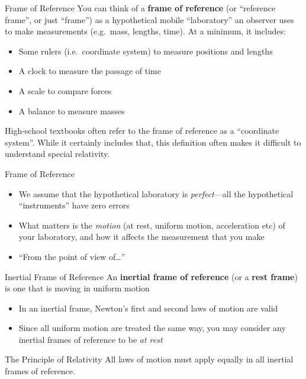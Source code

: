 \documentclass[12pt,compress,aspectratio=169]{beamer}
\begin{document}
\begin{frame}{Frame of Reference}
  You can think of a \textbf{frame of reference} (or ``reference frame'', or
  just ``frame'') as a hypothetical mobile ``laboratory'' an observer uses to
  make measurements (e.g.\ mass, lengths, time). At a minimum, it includes:
  \begin{itemize}
  \item Some rulers (i.e.\ coordinate system) to measure  positions and lengths
  \item A clock to measure the passage of time
  \item A scale to compare forces
  \item A balance to measure masses
  \end{itemize}
  \vspace{.15in}\textcolor{red!85}{High-school textbooks often refer to the
    frame of reference as a ``coordinate system''. While it certainly includes
    that, this definition often makes it difficult to understand special
    relativity.}
\end{frame}



\begin{frame}{Frame of Reference}
  \begin{itemize}
  \item We assume that the hypothetical laboratory is \emph{perfect}---all the
    hypothetical ``instruments'' have zero errors
  \item What matters is the \emph{motion} (at rest, uniform motion, acceleration
    etc) of your laboratory, and how it affects the measurement that you make
  \item ``From the point of view of\ldots''
  \end{itemize}
\end{frame}


\begin{frame}{Inertial Frame of Reference}
  An \textbf{inertial frame of reference} (or a \textbf{rest frame}) is one
  that is moving in uniform motion
  \begin{itemize}
  \item In an inertial frame, Newton's first and second laws of motion are valid
  \item Since all uniform motion are treated the same way, you may consider
    any inertial frames of reference to be \emph{at rest}
  \end{itemize}
  \vspace{.2in}
  \begin{block}{The Principle of Relativity}
    All laws of motion must apply equally in all inertial frames of reference.
  \end{block}
\end{frame}
\end{document}
